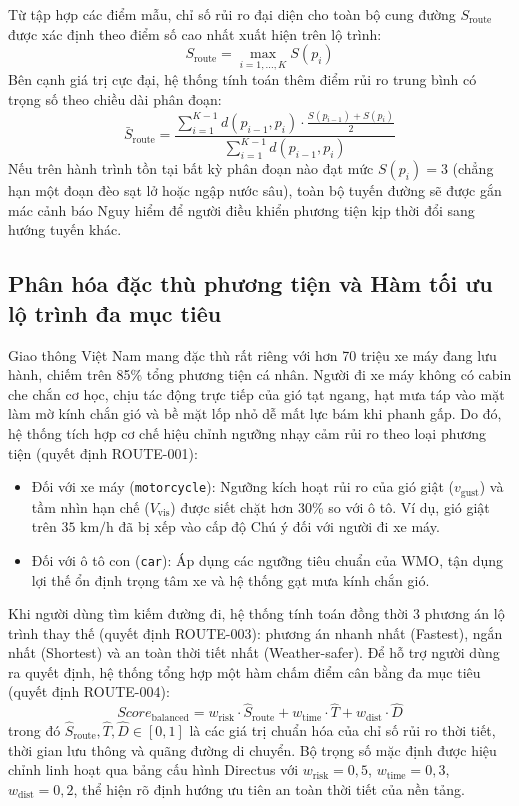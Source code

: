 Từ tập hợp các điểm mẫu, chỉ số rủi ro đại diện cho toàn bộ cung đường $S_{\text{route}}$ được xác định theo điểm số cao nhất xuất hiện trên lộ trình:
\begin{equation}
\label{eq:route_risk_max}
S_{\text{route}} = \max_{i=1,\dots,K} S(p_i)
\end{equation}
Bên cạnh giá trị cực đại, hệ thống tính toán thêm điểm rủi ro trung bình có trọng số theo chiều dài phân đoạn:
\begin{equation}
\label{eq:route_risk_avg}
\bar{S}_{\text{route}} = \frac{\sum_{i=1}^{K-1} d(p_{i-1}, p_i) \cdot \frac{S(p_{i-1}) + S(p_i)}{2}}{\sum_{i=1}^{K-1} d(p_{i-1}, p_i)}
\end{equation}
Nếu trên hành trình tồn tại bất kỳ phân đoạn nào đạt mức $S(p_i) = 3$ (chẳng hạn một đoạn đèo sạt lở hoặc ngập nước sâu), toàn bộ tuyến đường sẽ được gắn mác cảnh báo Nguy hiểm để người điều khiển phương tiện kịp thời đổi sang hướng tuyến khác.

\subsection{Phân hóa đặc thù phương tiện và Hàm tối ưu lộ trình đa mục tiêu}

Giao thông Việt Nam mang đặc thù rất riêng với hơn 70 triệu xe máy đang lưu hành, chiếm trên 85\% tổng phương tiện cá nhân. Người đi xe máy không có cabin che chắn cơ học, chịu tác động trực tiếp của gió tạt ngang, hạt mưa táp vào mặt làm mờ kính chắn gió và bề mặt lốp nhỏ dễ mất lực bám khi phanh gấp. Do đó, hệ thống tích hợp cơ chế hiệu chỉnh ngưỡng nhạy cảm rủi ro theo loại phương tiện (quyết định ROUTE-001):
\begin{itemize}
    \item[-] Đối với xe máy (\texttt{motorcycle}): Ngưỡng kích hoạt rủi ro của gió giật ($v_{\text{gust}}$) và tầm nhìn hạn chế ($V_{\text{vis}}$) được siết chặt hơn 30\% so với ô tô. Ví dụ, gió giật trên $35\text{ km/h}$ đã bị xếp vào cấp độ Chú ý đối với người đi xe máy.
    \item[-] Đối với ô tô con (\texttt{car}): Áp dụng các ngưỡng tiêu chuẩn của WMO, tận dụng lợi thế ổn định trọng tâm xe và hệ thống gạt mưa kính chắn gió.
\end{itemize}

Khi người dùng tìm kiếm đường đi, hệ thống tính toán đồng thời 3 phương án lộ trình thay thế (quyết định ROUTE-003): phương án nhanh nhất (Fastest), ngắn nhất (Shortest) và an toàn thời tiết nhất (Weather-safer). Để hỗ trợ người dùng ra quyết định, hệ thống tổng hợp một hàm chấm điểm cân bằng đa mục tiêu (quyết định ROUTE-004):
\begin{equation}
\label{eq:balanced_route_score}
Score_{\text{balanced}} = w_{\text{risk}} \cdot \hat{S}_{\text{route}} + w_{\text{time}} \cdot \hat{T} + w_{\text{dist}} \cdot \hat{D}
\end{equation}
trong đó $\hat{S}_{\text{route}}, \hat{T}, \hat{D} \in [0, 1]$ là các giá trị chuẩn hóa của chỉ số rủi ro thời tiết, thời gian lưu thông và quãng đường di chuyển. Bộ trọng số mặc định được hiệu chỉnh linh hoạt qua bảng cấu hình Directus với $w_{\text{risk}} = 0{,}5$, $w_{\text{time}} = 0{,}3$, $w_{\text{dist}} = 0{,}2$, thể hiện rõ định hướng ưu tiên an toàn thời tiết của nền tảng.

